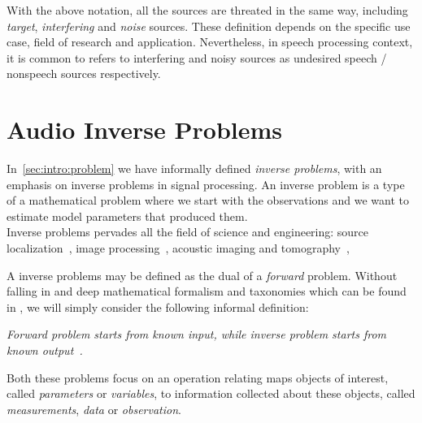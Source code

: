 With the above notation, all the sources are threated in the same way, including \textit{target}, \textit{interfering} and \textit{noise} sources.
These definition depends on the specific use case, field of research and application.
Nevertheless, in speech processing context,
it is common to refers to interfering and noisy sources as undesired speech \vs/ nonspeech sources respectively.

\section{Audio Inverse Problems}
\cite{kitic2015cosparse}
In~\cref{sec:intro:problem} we have informally defined \textit{inverse problems}, with an emphasis on inverse problems in signal processing.
An inverse problem is a type of a mathematical problem where we start with the observations and we want to estimate model parameters that produced them.
\\Inverse problems pervades all the field of science and engineering:
source localization~\cite{},
image processing~\cite{},
acoustic imaging and tomography~\cite{},

A inverse problems may be defined as the dual of a \textit{forward} problem.
Without falling in and deep mathematical formalism and taxonomies which can be found in ,
we will simply consider the following informal definition:
\begin{center}
    \textit{\emph{Forward problem} starts from known input, while \emph{inverse problem} starts from known output~\cite{santamarina2005discrete}.}
\end{center}
Both these problems focus on an operation relating maps objects of interest, called \textit{parameters} or \textit{variables},
to information collected about these objects, called \textit{measurements}, \textit{data} or \textit{observation}.

